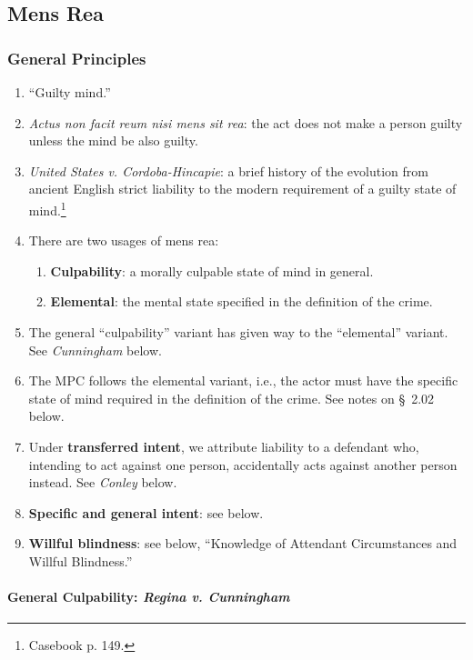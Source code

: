 \subsection{Mens Rea}

\subsubsection{General Principles}

\begin{enumerate}
    \item ``Guilty mind.''
    \item \emph{Actus non facit reum nisi mens sit rea}: the act does not make 
    a person guilty unless the mind be also guilty.
    \item \emph{United States v. Cordoba-Hincapie}: a brief history of the 
    evolution from ancient English strict liability to the modern requirement 
    of a guilty state of mind.\footnote{Casebook p. 149.}
    \item There are two usages of mens rea:
    \begin{enumerate}
        \item \textbf{Culpability}: a morally culpable state of mind in 
        general.
        \item \textbf{Elemental}: the mental state specified in the definition 
        of the crime.
    \end{enumerate}
    \item The general ``culpability'' variant has given way to the 
    ``elemental'' variant. See \emph{Cunningham} below.
    \item The MPC follows the elemental variant, i.e., the actor must have the 
    specific state of mind required in the definition of the crime. See 
    notes on \S\ 2.02 below.
    \item Under \textbf{transferred intent}, we attribute liability to a 
    defendant who, intending to act against one person, accidentally acts 
    against another person instead. See \emph{Conley} below.
    \item \textbf{Specific and general intent}: see below.
    \item \textbf{Willful blindness}: see below, ``Knowledge of Attendant 
    Circumstances and Willful Blindness.''
\end{enumerate}

\paragraph{General Culpability: \emph{Regina v. Cunningham}}


